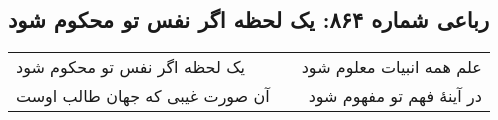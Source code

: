 \begin{center}
\section*{رباعی شماره ۸۶۴: یک لحظه اگر نفس تو محکوم شود}
\label{sec:0864}
\begin{longtable}{l p{0.5cm} r}
یک لحظه اگر نفس تو محکوم شود
&&
علم همه انبیات معلوم شود
\\
آن صورت غیبی که جهان طالب اوست
&&
در آینهٔ فهم تو مفهوم شود
\\
\end{longtable}
\end{center}
